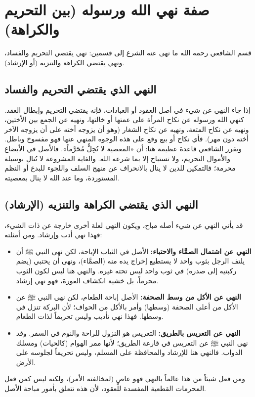 \section{صفة نهي الله ورسوله (بين التحريم والكراهة)}
قسم الشافعي رحمه الله ما نهى عنه الشرع إلى قسمين: نهي يقتضي التحريم والفساد، ونهي يقتضي الكراهة والتنزيه (أو الإرشاد).

\subsection{النهي الذي يقتضي التحريم والفساد}
إذا جاء النهي عن شيء في أصل العقود أو العبادات، فإنه يقتضي التحريم وإبطال العقد. كنهي الله ورسوله عن نكاح المرأة على عمتها أو خالتها، ونهيه عن الجمع بين الأختين، ونهيه عن نكاح المتعة، ونهيه عن نكاح الشغار (وهو أن يزوجه أخته على أن يزوجه الآخر أخته دون مهر).
فأي نكاح أو بيع وقع على هذه الوجوه المنهي عنها فهو مفسوخ وباطل.
ويقرر الشافعي قاعدة عظيمة هنا: أن «المعصية لا تُحِلُّ مُحَرَّماً». فالأصل في الأبضاع والأموال التحريم، ولا تستباح إلا بما شرعه الله. والغاية المشروعة لا تُنال بوسيلة محرمة؛ فالتمكين للدين لا ينال بالانحراف عن منهج السلف واللجوء للبدع أو النظم المستوردة، وما عند الله لا ينال بمعصيته.

\subsection{النهي الذي يقتضي الكراهة والتنزيه (الإرشاد)}
قد يأتي النهي عن شيء أصله مباح، ويكون النهي لعلة أخرى خارجة عن ذات الشيء، فهذا نهي أدب وإرشاد. ومن أمثلته:
\begin{itemize}
    \item \textbf{النهي عن اشتمال الصمَّاء والاحتباء:} الأصل في الثياب الإباحة، لكن نهى النبي ﷺ أن يلتف الرجل بثوب واحد لا يستطيع إخراج يده منه (الصمَّاء)، ونهى أن يحتبي (يضم ركبتيه إلى صدره) في ثوب واحد ليس تحته غيره. والنهي هنا ليس لكون الثوب محرماً، بل خشية انكشاف العورة، فهو نهي إرشاد.
    \item \textbf{النهي عن الأكل من وسط الصحفة:} الأصل إباحة الطعام، لكن نهى النبي ﷺ عن الأكل من أعلى الصحفة (وسطها) وأمر بالأكل من الحواف؛ لأن البركة تنزل في وسطها. فهذا نهي تأديب وليس تحريماً لذات الطعام.
    \item \textbf{النهي عن التعريس بالطريق:} التعريس هو النزول للراحة والنوم في السفر. وقد نهى النبي ﷺ عن التعريس في قارعة الطريق؛ لأنها ممر الهوام (كالحيات) ومسلك الدواب. فالنهي هنا للإرشاد والمحافظة على المسلم، وليس تحريماً لجلوسه على الأرض.
\end{itemize}
ومن فعل شيئاً من هذا عالماً بالنهي فهو عاصٍ (لمخالفته الأمر)، ولكنه ليس كمن فعل المحرمات القطعية المفسدة للعقود، لأن هذه تتعلق بأمور مباحة الأصل.

